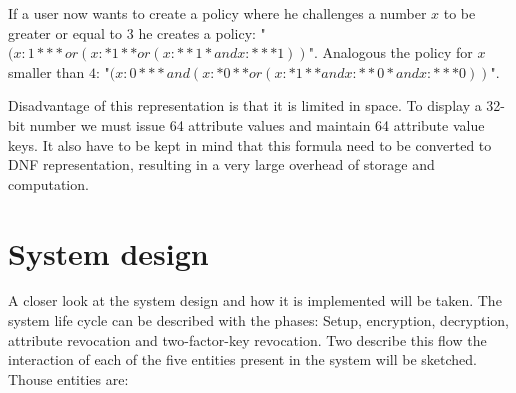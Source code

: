 If a user now wants to create a policy where he challenges a number $x$ to be greater or equal to $3$ he creates a policy: "$(x:1*** or (x:*1** or (x:**1* and x:***1))$". Analogous the policy for $x$ smaller than $4$: "$(x:0*** and (x:*0** or (x:*1** and x:**0* and x:***0))$".

Disadvantage of this representation is that it is limited in space. To display a 32-bit number we must issue 64 attribute values and maintain 64 attribute value keys. It also have to be kept in mind that this formula need to be converted to DNF representation, resulting in a very large overhead of storage and computation.

\section{System design}
A closer look at the system design and how it is implemented will be taken. The system life cycle can be described with the phases: Setup, encryption, decryption, attribute revocation and two-factor-key revocation. Two describe this flow the interaction of each of the five entities present in the system will be sketched. Thouse entities are:

